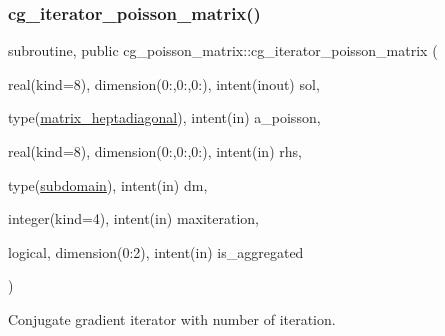 \subsubsection{\texorpdfstring{cg\+\_\+iterator\+\_\+poisson\+\_\+matrix()}{cg\_iterator\_poisson\_matrix()}}
{\footnotesize\ttfamily subroutine, public cg\+\_\+poisson\+\_\+matrix\+::cg\+\_\+iterator\+\_\+poisson\+\_\+matrix (\begin{DoxyParamCaption}\item[{real(kind=8), dimension(0\+:,0\+:,0\+:), intent(inout)}]{sol,  }\item[{type(\hyperlink{structmatrix_1_1matrix__heptadiagonal}{matrix\+\_\+heptadiagonal}), intent(in)}]{a\+\_\+poisson,  }\item[{real(kind=8), dimension(0\+:,0\+:,0\+:), intent(in)}]{rhs,  }\item[{type(\hyperlink{structgeometry_1_1subdomain}{subdomain}), intent(in)}]{dm,  }\item[{integer(kind=4), intent(in)}]{maxiteration,  }\item[{logical, dimension(0\+:2), intent(in)}]{is\+\_\+aggregated }\end{DoxyParamCaption})}



Conjugate gradient iterator with number of iteration. 


